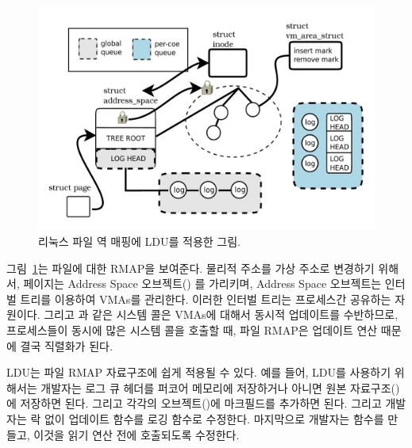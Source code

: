 \begin{figure}[tb]
  \begin{center}
     \includegraphics[width=1\textwidth,height=1\textheight,keepaspectratio]{fig/file_rmap}
  \end{center}
  \caption{리눅스 파일 역 매핑에 LDU를 적용한 그림.}
  \label{fig:fileramp}
\end{figure}

그림~\ref{fig:fileramp}는 파일에 대한 RMAP을 보여준다.
물리적 주소를 가상 주소로 변경하기 위해서, 페이지는 Address Space 오브젝트()
를 가리키며, Address Space 오브젝트는 인터벌 트리를 이용하여 VMAs를 관리한다.
이러한 인터벌 트리는 프로세스간 공유하는 자원이다. 
 그리고 과 같은 시스템 콜은 VMAs에 대해서 동시적 업데이트를 
수반하므로, 프로세스들이 동시에 많은 시스템 콜을 호출할 때, 
파일 RMAP은 업데이트 연산 때문에 결국 직렬화가 된다. 

LDU는 파일 RMAP 자료구조에 쉽게 적용될 수 있다. 
예를 들어, LDU를 사용하기 위해서는 개발자는 로그 큐 헤더를 퍼코어 메모리에 저장하거나 
아니면 원본 자료구조()에 저장하면 된다.
그리고 각각의 오브젝트()에 마크필드를 추가하면 된다. 
그리고 개발자는 락 없이 업데이트 함수를 로깅 함수로 수정한다.  
마지막으로 개발자는  함수를 만들고, 이것을 읽기 연산 전에 호출되도록 수정한다.

